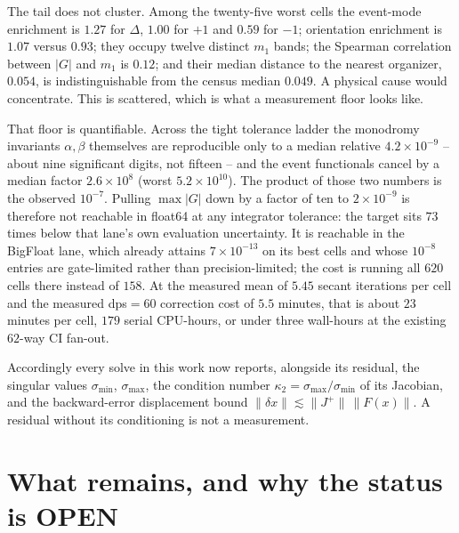 \documentclass[11pt]{article}
\begin{document}
The tail does not cluster.  Among the twenty-five worst cells the event-mode
enrichment is $1.27$ for $\Delta$, $1.00$ for $+1$ and $0.59$ for $-1$;
orientation enrichment is $1.07$ versus $0.93$; they occupy twelve distinct
$m_1$ bands; the Spearman correlation between $|G|$ and $m_1$ is $0.12$; and
their median distance to the nearest organizer, $0.054$, is indistinguishable
from the census median $0.049$.  A physical cause would concentrate.  This is
scattered, which is what a measurement floor looks like.

That floor is quantifiable.  Across the tight tolerance ladder the monodromy
invariants $\alpha,\beta$ themselves are reproducible only to a median relative
$4.2\times10^{-9}$ -- about nine significant digits, not fifteen -- and the
event functionals cancel by a median factor $2.6\times10^{8}$ (worst
$5.2\times10^{10}$).  The product of those two numbers is the observed
$10^{-7}$.  Pulling $\max|G|$ down by a factor of ten to $2\times10^{-9}$ is
therefore not reachable in float64 at any integrator tolerance: the target sits
$73$ times below that lane's own evaluation uncertainty.  It is reachable in the
BigFloat lane, which already attains $7\times10^{-13}$ on its best cells and
whose $10^{-8}$ entries are gate-limited rather than precision-limited; the cost
is running all $620$ cells there instead of $158$.  At the measured mean of
$5.45$ secant iterations per cell and the measured dps$=60$ correction cost of
$5.5$ minutes, that is about $23$ minutes per cell, $179$ serial CPU-hours, or
under three wall-hours at the existing $62$-way CI fan-out.

Accordingly every solve in this work now reports, alongside its residual, the
singular values $\sigma_{\min}$, $\sigma_{\max}$, the condition number
$\kappa_2=\sigma_{\max}/\sigma_{\min}$ of its Jacobian, and the backward-error
displacement bound $\|\delta x\|\lesssim\|J^{+}\|\,\|F(x)\|$.  A residual
without its conditioning is not a measurement.

\section{What remains, and why the status is OPEN}
\end{document}

